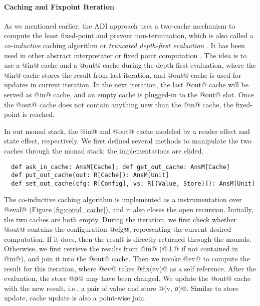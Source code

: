 
\paragraph{Caching and Fixpoint Iteration}

As we mentioned earlier, the ADI approach uses a two-cache mechanism to
compute the least fixed-point and prevent non-termination, which is also called a
\textit{co-inductive} caching algorithm or \textit{truncated depth-first
evaluation} \cite{Rosendahl:AbsIntPL}. It has been used in other abstract
interpretater or fixed point computation
\cite{DBLP:journals/pacmpl/DaraisLNH17, Wei:2018:RAA:3243631.3236800,
  Rosendahl:AbsIntPL}. The idea is to use a @in@ cache and a @out@ cache during
the depth-first evaluation, where the @in@ cache stores the result from last
iteration, and @out@ cache is used for updates in current iteration. In the next
iteration, the last @out@ cache will be served as @in@ cache, and an empty cache
is plugged-in to the @out@ slot. Once the @out@ cache does not contain anything
new than the @in@ cache, the fixed-point is reached.

In out monad stack, the @in@ and @out@ cache modeled by a reader effect and
state effect, respectively. We first defined several methods to manipulate
the two caches through the monad stack; the implementations are elided.

\begin{lstlisting}
  def ask_in_cache: AnsM[Cache]; def get_out_cache: AnsM[Cache]
  def put_out_cache(out: R[Cache]): AnsM[Unit]
  def set_out_cache(cfg: R[Config], vs: R[(Value, Store)]): AnsM[Unit]
\end{lstlisting}

The co-inductive caching algorithm is implemented as a instrumentation over
@eval@ (Figure \ref{fig:coind_cache}), and it also closes the open recursion.
Initially, the two caches are both empty.
During the iteration, we first check whether @out@ contains the configuration
@cfg@, representing the current desired computation. If it does, then the result
is directly returned through the monads.
Otherwise, we first retrieve the results from @in@ (@⊥@ if not contained in
@in@), and join it into the @out@ cache.
Then we invoke @ev@ to compute the result for this iteration, where @ev@ takes
@fix(ev)@ as a self reference.
After the evaluation, the store @σ@ may have been changed. We update the
@out@ cache with the new result, i.e., a pair of value and store @(v, σ)@.
Similar to store update, cache update is also a point-wise join.

